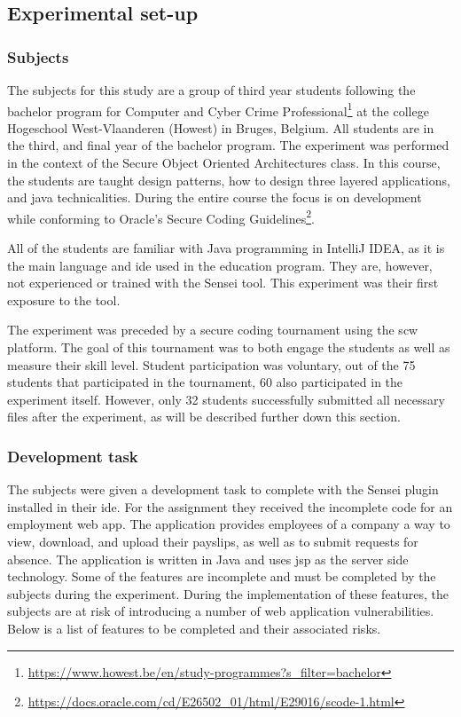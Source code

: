 \subsection{Experimental set-up}
\subsubsection{Subjects}
The subjects for this study are a group of third year students following the bachelor program for Computer and Cyber Crime Professional\footnote{\url{https://www.howest.be/en/study-programmes?s_filter=bachelor}} at the college Hogeschool West-Vlaanderen (Howest) in Bruges, Belgium.
All students are in the third, and final year of the bachelor program.
The experiment was performed in the context of the Secure Object Oriented Architectures class.
In this course, the students are taught design patterns, how to design three layered applications, and java technicalities.
During the entire course the focus is on development while conforming to Oracle's Secure Coding Guidelines\footnote{\url{https://docs.oracle.com/cd/E26502\_01/html/E29016/scode-1.html}}.

All of the students are familiar with Java programming in IntelliJ IDEA, as it is the main language and \gls{ide} used in the education program.
They are, however, not experienced or trained with the Sensei tool.
This experiment was their first exposure to the tool. 

The experiment was preceded by a secure coding tournament using the \gls{scw} platform.
The goal of this tournament was to both engage the students as well as measure their skill level.
Student participation was voluntary, out of the 75 students that participated in the tournament, 60 also participated in the experiment itself.
However, only 32 students successfully submitted all necessary files after the experiment, as will be described further down this section.

\subsubsection{Development task}
\label{sec:task}
The subjects were given a development task to complete with the Sensei plugin installed in their \gls{ide}.
For the assignment they received the incomplete code for an employment web app.
The application provides employees of a company a way to view, download, and upload their payslips, as well as to submit requests for absence.
The application is written in Java and uses \gls{jsp} as the server side technology.
Some of the features are incomplete and must be completed by the subjects during the experiment.
During the implementation of these features, the subjects are at risk of introducing a number of web application vulnerabilities.
Below is a list of features to be completed and their associated risks.

